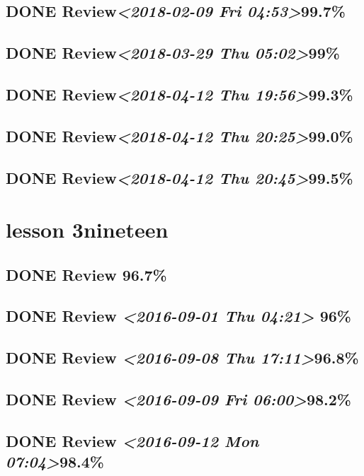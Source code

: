 \documentclass[11pt]{ctexart}
\begin{document}
\subsection{{\bfseries\sffamily DONE} Review\textit{<2018-02-09 Fri 04:53>}99.7\%}
\label{sec:org315407a}
\subsection{{\bfseries\sffamily DONE} Review\textit{<2018-03-29 Thu 05:02>}99\%}
\label{sec:org8ab985e}
\subsection{{\bfseries\sffamily DONE} Review\textit{<2018-04-12 Thu 19:56>}99.3\%}
\label{sec:orgc770bc9}
\subsection{{\bfseries\sffamily DONE} Review\textit{<2018-04-12 Thu 20:25>}99.0\%}
\label{sec:orgde0e6f0}
\subsection{{\bfseries\sffamily DONE} Review\textit{<2018-04-12 Thu 20:45>}99.5\%}
\label{sec:org63ecf28}
\section{lesson 3nineteen}
\label{sec:orga813ead}
\subsection{{\bfseries\sffamily DONE} Review 96.7\%}
\label{sec:org81cd246}
\subsection{{\bfseries\sffamily DONE} Review \textit{<2016-09-01 Thu 04:21> } 96\%}
\label{sec:org95748da}
\subsection{{\bfseries\sffamily DONE} Review \textit{<2016-09-08 Thu 17:11>}96.8\%}
\label{sec:org759ea7a}
\subsection{{\bfseries\sffamily DONE} Review \textit{<2016-09-09 Fri 06:00>}98.2\%}
\label{sec:org180b2f9}
\subsection{{\bfseries\sffamily DONE} Review \textit{<2016-09-12 Mon 07:04>}98.4\%}
\label{sec:org59256ee}
\end{document}
